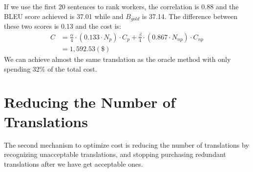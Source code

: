 \documentclass[11pt,letterpaper]{article}
\begin{document}
If we use the first 20 sentences to rank workers, the correlation is 0.88 and  the BLEU score achieved is 37.01 while  and $B_{gold}$ is 37.14. The difference between these two scores is 0.13 and the cost is: \\
  \begin{align*}
  C& = \frac{\alpha}{4} \cdot  (0.133 \cdot N_{p}) \cdot C_{p}  + \frac{\beta }{4}\cdot (0.867\cdot N_{np} ) \cdot C_{np}\\
   & = 1,592.53 (\$)
  \end{align*}  
We can achieve almost the same translation as the oracle method with only spending 32\% of the total cost. 

\section{Reducing the Number of Translations}
The second mechanism to optimize cost is reducing the number of translations by recognizing unacceptable translations, and stopping purchasing redundant translations after we have get acceptable ones. 
\end{document}
